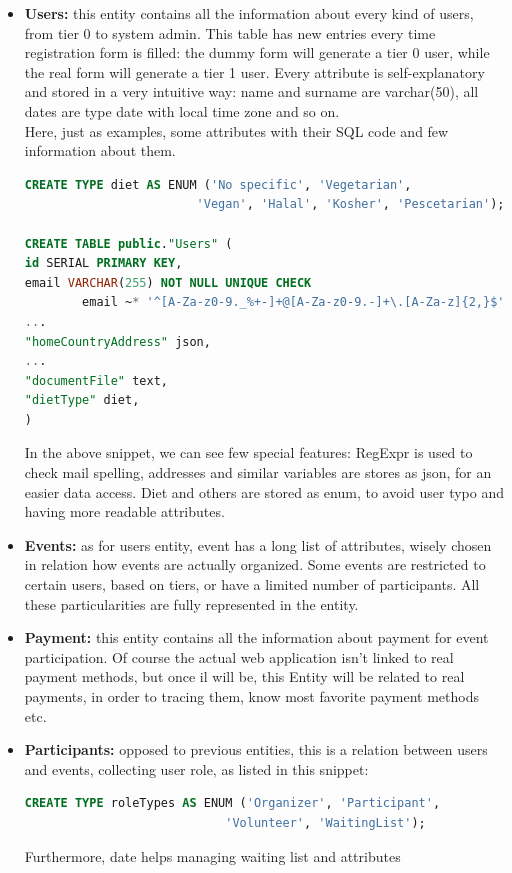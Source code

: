 \begin{itemize}
    \item \textbf{Users:} this entity contains all the information about every kind of users, from
    tier 0 to system admin. This table has new entries every time registration form is filled: the dummy
    form will generate a tier 0 user, while the real form will generate a tier 1 user. Every attribute 
    is self-explanatory and stored in a very intuitive way: name and surname are varchar(50), all dates
    are type date with local time zone and so on.\\
    Here, just as examples, some attributes with their SQL code and few information about them.
\begin{lstlisting}[language=SQL]
CREATE TYPE diet AS ENUM ('No specific', 'Vegetarian',
                        'Vegan', 'Halal', 'Kosher', 'Pescetarian');

CREATE TABLE public."Users" (
id SERIAL PRIMARY KEY,
email VARCHAR(255) NOT NULL UNIQUE CHECK 
        email ~* '^[A-Za-z0-9._%+-]+@[A-Za-z0-9.-]+\.[A-Za-z]{2,}$'),
...
"homeCountryAddress" json,
...
"documentFile" text,
"dietType" diet,
)
\end{lstlisting}
    In the above snippet, we can see few special features: RegExpr is used to check mail spelling,
    addresses and similar variables are stores as json, for an easier data access. Diet and others
    are stored as enum, to avoid user typo and having more readable attributes. %
    \item \textbf{Events:} as for users entity, event has a long list of attributes, wisely chosen
    in relation how events are actually organized. Some events are restricted to certain users, based
    on tiers, or have a limited number of participants. All these particularities are fully represented
    in the entity.
    \item \textbf{Payment:} this entity contains all the information about payment for event participation.
    Of course the actual web application isn't linked to real payment methods, but once il will be, this Entity
    will be related to real payments, in order to tracing them, know most favorite payment methods etc.
    \item \textbf{Participants:} opposed to previous entities, this is a relation between users and events,
    collecting user role, as listed in this snippet:
\begin{lstlisting}[language=SQL]
CREATE TYPE roleTypes AS ENUM ('Organizer', 'Participant',
                            'Volunteer', 'WaitingList');
\end{lstlisting}
    Furthermore, date helps managing waiting list and attributes %
\end{itemize}